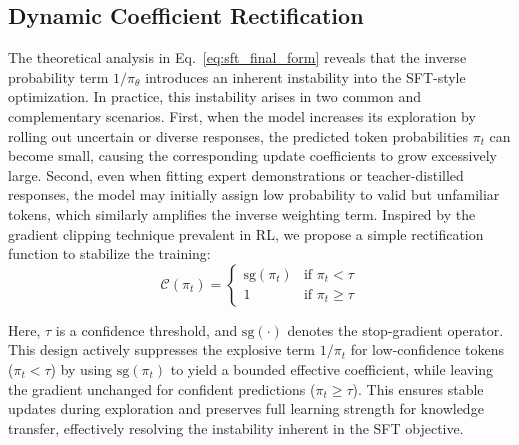 


\subsection{Dynamic Coefficient Rectification}

The theoretical analysis in Eq.~\eqref{eq:sft_final_form} reveals that the inverse probability term $1/\pi_{\theta}$ introduces an inherent instability into the SFT-style optimization.
In practice, this instability arises in two common and complementary scenarios.
First, when the model increases its exploration by rolling out uncertain or diverse responses, the predicted token probabilities $\pi_t$ can become small, causing the corresponding update coefficients to grow excessively large.
Second, even when fitting expert demonstrations or teacher-distilled responses, the model may initially assign low probability to valid but unfamiliar tokens, which similarly amplifies the inverse weighting term. Inspired by the gradient clipping technique prevalent in RL, we propose a simple rectification function to stabilize the training:
\begin{equation}\label{eq:rectification_factor}
        \mathcal{C}(\pi_t) = 
        \begin{cases} 
            \text{sg}(\pi_t) & \text{if } \pi_t < \tau\\ 
            1 & \text{if } \pi_t \ge \tau
        \end{cases}
\end{equation}

Here, $\tau$ is a confidence threshold, and $\text{sg}(\cdot)$ denotes the stop-gradient operator. This design actively suppresses the explosive term $1/\pi_t$ for low-confidence tokens ($\pi_t < \tau$) by using $\text{sg}(\pi_t)$ to yield a bounded effective coefficient, while leaving the gradient unchanged for confident predictions ($\pi_t \ge \tau$). This ensures stable updates during exploration and preserves full learning strength for knowledge transfer, effectively resolving the instability inherent in the SFT objective.

